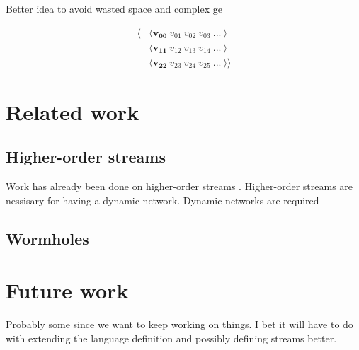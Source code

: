 \documentclass[twocolumn]{paper}
\begin{document}
Better idea to avoid wasted space and complex ge


\begin{align*}
  \langle &\langle \mathbf{v_{00}} ~ v_{01} ~ v_{02} ~ v_{03} ~ ... ~ \rangle \\
  &\langle  \mathbf{v_{11}} ~ v_{12} ~ v_{13} ~ v_{14} ~ ... ~ \rangle \\
  &\langle  \mathbf{v_{22}} ~ v_{23} ~ v_{24} ~ v_{25} ~ ...  ~ \rangle \rangle
\end{align*}

\section{Related work}

\subsection{Higher-order streams}
Work has already been done on higher-order streams \cite{HighOrderStreams}. Higher-order streams are nessisary for having a dynamic network. Dynamic networks are required

\subsection{Wormholes}
\cite{WinogradCort2012HS}
\section{Future work}
Probably some since we want to keep working on things. I bet it will have to do with extending the language definition and possibly defining streams better.




\end{document}
